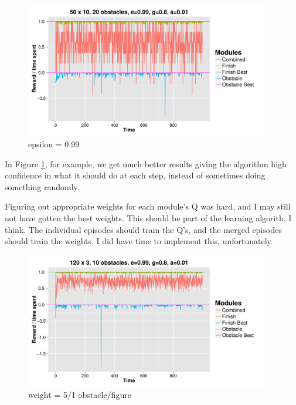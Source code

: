 \documentclass[11pt]{report}
\begin{document}
\begin{figure}[H]
  \centering
  \includegraphics[width=0.95\textwidth]{results/qlearn-s50x10-o20-e99.pdf}
  \caption{epsilon = 0.99}
  \label{fig:ep099}
\end{figure}

\noindent In Figure \ref{fig:ep099}, for example, we get much better results giving the algorithm high confidence in what it should do at each step, instead of sometimes doing something randomly.


Figuring out appropriate weights for each module's Q was hard, and I may still not have gotten the best weights. This should be part of the learning algorith, I think. The individual episodes should train the Q's, and the merged episodes should train the weights. I did have time to implement this, unfortunately.

\begin{figure}[H]
  \centering
  \includegraphics[width=0.95\textwidth]{results/qlearn-s120x3-o10.pdf}
  \caption{weight = 5/1 obstacle/figure}
\end{figure}
\end{document}
